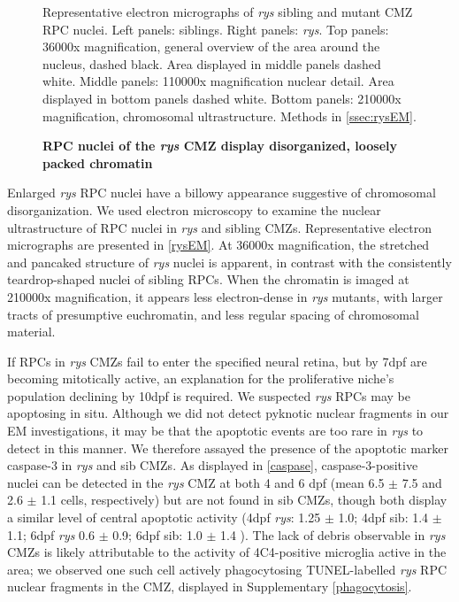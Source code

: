 \FloatBarrier

\begin{figure}[!h]
    \caption{{\bf RPC nuclei of the \textit{rys} CMZ display disorganized, loosely packed chromatin}}
    Representative electron micrographs of \textit{rys} sibling and mutant CMZ RPC nuclei.
    Left panels: siblings. Right panels: \textit{rys}. Top panels: 36000x magnification, general overview of the area around the nucleus, dashed black. Area displayed in middle panels dashed white. Middle panels: 110000x magnification nuclear detail. Area displayed in bottom panels dashed white. Bottom panels: 210000x magnification, chromosomal ultrastructure.
    Methods in \autoref{ssec:rysEM}.
    \label{rysEM}
\end{figure}

Enlarged \textit{rys} RPC nuclei have a billowy appearance suggestive of chromosomal disorganization. We used electron microscopy to examine the nuclear ultrastructure of RPC nuclei in \textit{rys} and sibling CMZs. Representative electron micrographs are presented in \autoref{rysEM}. At 36000x magnification, the stretched and pancaked structure of \textit{rys} nuclei is apparent, in contrast with the consistently teardrop-shaped nuclei of sibling RPCs. When the chromatin is imaged at 210000x magnification, it appears less electron-dense in \textit{rys} mutants, with larger tracts of presumptive euchromatin, and less regular spacing of chromosomal material.
\FloatBarrier

If RPCs in \textit{rys} CMZs fail to enter the specified neural retina, but by 7dpf are becoming mitotically active, an explanation for the proliferative niche's population declining by 10dpf is required. We suspected \textit{rys} RPCs may be apoptosing in situ. Although we did not detect pyknotic nuclear fragments in our EM investigations, it may be that the apoptotic events are too rare in \textit{rys} to detect in this manner. We therefore assayed the presence of the apoptotic marker caspase-3 in \textit{rys} and sib CMZs. As displayed in \autoref{caspase}, caspase-3-positive nuclei can be detected in the \textit{rys} CMZ at both 4 and 6 dpf (mean 6.5 $\pm$ 7.5 and 2.6 $\pm$ 1.1 cells, respectively) but are not found in sib CMZs, though both display a similar level of central apoptotic activity (4dpf \textit{rys}: 1.25 $\pm$ 1.0; 4dpf sib: 1.4 $\pm$ 1.1; 6dpf \textit{rys} 0.6 $\pm$ 0.9; 6dpf sib: 1.0 $\pm$ 1.4 ). The lack of debris observable in \textit{rys} CMZs is likely attributable to the activity of 4C4-positive microglia active in the area; we observed one such cell actively phagocytosing TUNEL-labelled \textit{rys} RPC nuclear fragments in the CMZ, displayed in Supplementary \autoref{phagocytosis}.

